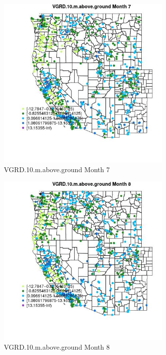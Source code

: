 \begin{figure} 
\centering  
\includegraphics[width=0.77\textwidth]{Code_Outputs/Report_ML_input_PM25_Step4_part_e_de_duplicated_aves_compiled_2019-05-21wNAs_MapObsMo7VGRD10maboveground.jpg} 
\caption{\label{fig:Report_ML_input_PM25_Step4_part_e_de_duplicated_aves_compiled_2019-05-21wNAsMapObsMo7VGRD10maboveground}VGRD.10.m.above.ground Month 7} 
\end{figure} 
 

\begin{figure} 
\centering  
\includegraphics[width=0.77\textwidth]{Code_Outputs/Report_ML_input_PM25_Step4_part_e_de_duplicated_aves_compiled_2019-05-21wNAs_MapObsMo8VGRD10maboveground.jpg} 
\caption{\label{fig:Report_ML_input_PM25_Step4_part_e_de_duplicated_aves_compiled_2019-05-21wNAsMapObsMo8VGRD10maboveground}VGRD.10.m.above.ground Month 8} 
\end{figure} 
 

